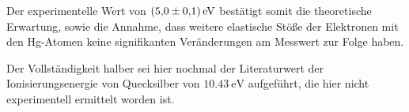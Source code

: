 Der experimentelle Wert von $\SI{5.0+-0.1}{\electronvolt}$ bestätigt somit die theoretische Erwartung, sowie die Annahme, 
dass weitere elastische Stöße der Elektronen mit den Hg-Atomen keine signifikanten Veränderungen am Messwert 
zur Folge haben.

Der Vollständigkeit halber sei hier nochmal der Literaturwert der Ionisierungsenergie von Quecksilber von 
$\SI{10.43}{\electronvolt}$ aufgeführt, die hier nicht experimentell ermittelt worden ist. 
